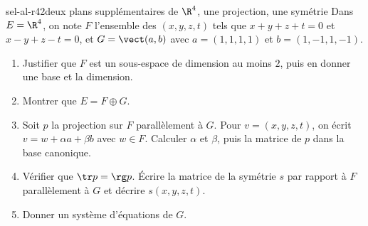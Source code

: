 \begin{exo}{sel-al-r4}{2}{deux plans supplémentaires de $\R^4$, une projection, une symétrie}
Dans $E=\R^4$, on note $F$ l'ensemble des $(x,y,z,t)$ tels que $x+y+z+t=0$ et $x-y+z-t=0$, et $G=\vect(a,b)$ avec
$a=(1,1,1,1)$ et $b=(1,-1,1,-1)$.
\begin{enumerate}
\item Justifier que $F$ est un sous-espace de dimension au moins $2$, puis en donner une base et la dimension.
\item Montrer que $E=F\oplus G$.
\item Soit $p$ la projection sur $F$ parallèlement à $G$. Pour $v=(x,y,z,t)$, on écrit $v=w+\alpha a+\beta b$ avec $w\in F$.
Calculer $\alpha$ et $\beta$, puis la matrice de $p$ dans la base canonique.
\item Vérifier que $\tr p=\rg p$. Écrire la matrice de la symétrie $s$ par rapport à $F$ parallèlement à $G$ et décrire $s(x,y,z,t)$.
\item Donner un système d'équations de $G$.
\end{enumerate}
\end{exo}

